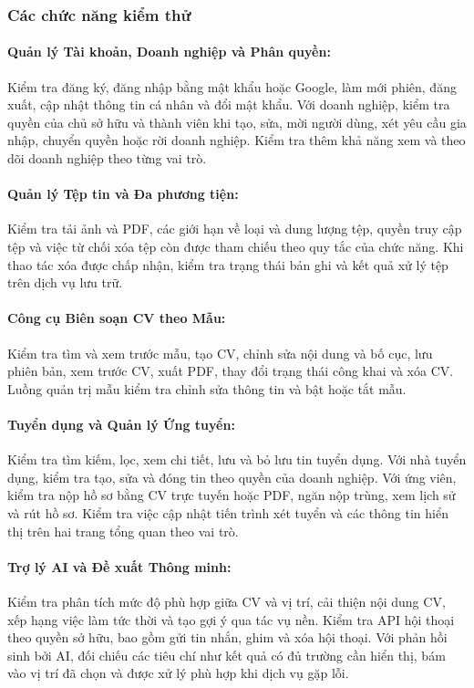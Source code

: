 \subsubsection{Các chức năng kiểm thử}

\paragraph{Quản lý Tài khoản, Doanh nghiệp và Phân quyền:}
Kiểm tra đăng ký, đăng nhập bằng mật khẩu hoặc Google, làm mới phiên, đăng xuất, cập nhật thông tin cá nhân và đổi mật khẩu. Với doanh nghiệp, kiểm tra quyền của chủ sở hữu và thành viên khi tạo, sửa, mời người dùng, xét yêu cầu gia nhập, chuyển quyền hoặc rời doanh nghiệp. Kiểm tra thêm khả năng xem và theo dõi doanh nghiệp theo từng vai trò.

\paragraph{Quản lý Tệp tin và Đa phương tiện:}
Kiểm tra tải ảnh và PDF, các giới hạn về loại và dung lượng tệp, quyền truy cập tệp và việc từ chối xóa tệp còn được tham chiếu theo quy tắc của chức năng. Khi thao tác xóa được chấp nhận, kiểm tra trạng thái bản ghi và kết quả xử lý tệp trên dịch vụ lưu trữ.

\paragraph{Công cụ Biên soạn CV theo Mẫu:}
Kiểm tra tìm và xem trước mẫu, tạo CV, chỉnh sửa nội dung và bố cục, lưu phiên bản, xem trước CV, xuất PDF, thay đổi trạng thái công khai và xóa CV. Luồng quản trị mẫu kiểm tra chỉnh sửa thông tin và bật hoặc tắt mẫu.

\paragraph{Tuyển dụng và Quản lý Ứng tuyển:}
Kiểm tra tìm kiếm, lọc, xem chi tiết, lưu và bỏ lưu tin tuyển dụng. Với nhà tuyển dụng, kiểm tra tạo, sửa và đóng tin theo quyền của doanh nghiệp. Với ứng viên, kiểm tra nộp hồ sơ bằng CV trực tuyến hoặc PDF, ngăn nộp trùng, xem lịch sử và rút hồ sơ. Kiểm tra việc cập nhật tiến trình xét tuyển và các thông tin hiển thị trên hai trang tổng quan theo vai trò.

\paragraph{Trợ lý AI và Đề xuất Thông minh:}
Kiểm tra phân tích mức độ phù hợp giữa CV và vị trí, cải thiện nội dung CV, xếp hạng việc làm tức thời và tạo gợi ý qua tác vụ nền. Kiểm tra API hội thoại theo quyền sở hữu, bao gồm gửi tin nhắn, ghim và xóa hội thoại. Với phản hồi sinh bởi AI, đối chiếu các tiêu chí như kết quả có đủ trường cần hiển thị, bám vào vị trí đã chọn và được xử lý phù hợp khi dịch vụ gặp lỗi.

